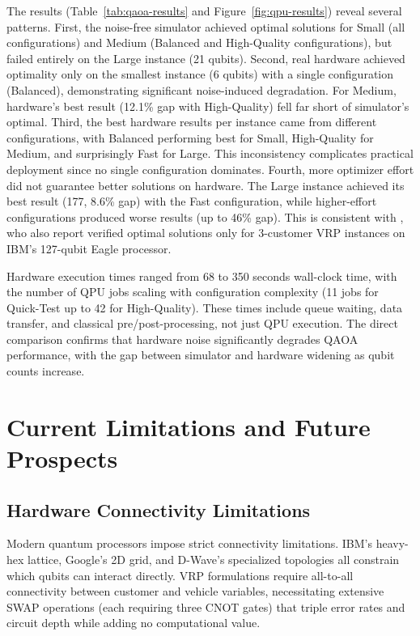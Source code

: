 \documentclass[preprint,3p,12pt,authoryear]{elsarticle}
\begin{document}
The results (Table~\ref{tab:qaoa-results} and Figure~\ref{fig:qpu-results}) reveal several patterns. First, the noise-free simulator achieved optimal solutions for Small (all configurations) and Medium (Balanced and High-Quality configurations), but failed entirely on the Large instance (21 qubits). Second, real hardware achieved optimality only on the smallest instance (6 qubits) with a single configuration (Balanced), demonstrating significant noise-induced degradation. For Medium, hardware's best result (12.1\% gap with High-Quality) fell far short of simulator's optimal. Third, the best hardware results per instance came from different configurations, with Balanced performing best for Small, High-Quality for Medium, and surprisingly Fast for Large. This inconsistency complicates practical deployment since no single configuration dominates. Fourth, more optimizer effort did not guarantee better solutions on hardware. The Large instance achieved its best result (177, 8.6\% gap) with the Fast configuration, while higher-effort configurations produced worse results (up to 46\% gap). This is consistent with \citet{azfar2025quantum}, who also report verified optimal solutions only for 3-customer VRP instances on IBM’s 127-qubit Eagle processor.

Hardware execution times ranged from 68 to 350 seconds wall-clock time, with the number of QPU jobs scaling with configuration complexity (11 jobs for Quick-Test up to 42 for High-Quality). These times include queue waiting, data transfer, and classical pre/post-processing, not just QPU execution. The direct comparison confirms that hardware noise significantly degrades QAOA performance, with the gap between simulator and hardware widening as qubit counts increase.

\section{Current Limitations and Future Prospects}\label{sec:limitations}

\subsection{Hardware Connectivity Limitations}

Modern quantum processors impose strict connectivity limitations. IBM's heavy-hex lattice, Google's 2D grid, and D-Wave's specialized topologies all constrain which qubits can interact directly. VRP formulations require all-to-all connectivity between customer and vehicle variables, necessitating extensive SWAP operations (each requiring three CNOT gates) that triple error rates and circuit depth while adding no computational value.
\end{document}
